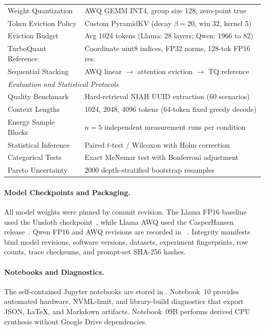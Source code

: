 \documentclass[sigconf,nonacm]{acmart}
\begin{document}
\begin{table}[htbp]
{\begin{tabular}{@{}ll@{}}
Weight Quantization & AWQ GEMM INT4, group size 128, zero-point true \\
Token Eviction Policy & Custom PyramidKV (decay $\beta=20$, win 32, kernel 5) \\
Eviction Budget & Avg 1024 tokens (Llama: 28 layers; Qwen: 1966 to 82) \\
TurboQuant Reference & Coordinate uint8 indices, FP32 norms, 128-tok FP16 res. \\
Sequential Stacking & AWQ linear $\to$ attention eviction $\to$ TQ reference \\
\midrule
\multicolumn{2}{l}{\textit{Evaluation and Statistical Protocols}} \\
Quality Benchmark & Hard-retrieval NIAH UUID extraction (60 scenarios) \\
Context Lengths & 1024, 2048, 4096 tokens (64-token fixed greedy decode) \\
Energy Sample Blocks & $n=5$ independent measurement runs per condition \\
Statistical Inference & Paired $t$-test / Wilcoxon with Holm correction \\
Categorical Tests & Exact McNemar test with Bonferroni adjustment \\
Pareto Uncertainty & 2000 depth-stratified bootstrap resamples \\
\bottomrule
\end{tabular}}
\end{table}

\paragraph{Model Checkpoints and Packaging.}
\begingroup\raggedright
All model weights were pinned by commit revision. The Llama FP16 baseline used
the Unsloth checkpoint~\cite{unsloth_2024}, while Llama AWQ used the
CasperHansen release~\cite{casperhansen_llama32_awq}. Qwen FP16 and AWQ revisions are recorded in
~\cite{qwen2024technical}.
Integrity manifests bind model revisions, software versions, datasets, experiment
fingerprints, row counts, trace checksums, and prompt-set SHA-256 hashes.
\par\endgroup

\paragraph{Notebooks and Diagnostics.}
The self-contained Jupyter notebooks are stored in
. Notebook~10 provides automated
hardware, NVML-limit, and library-build diagnostics that export JSON, LaTeX, and
Markdown artifacts. Notebook~09B performs derived CPU synthesis without Google
Drive dependencies.
\end{document}
